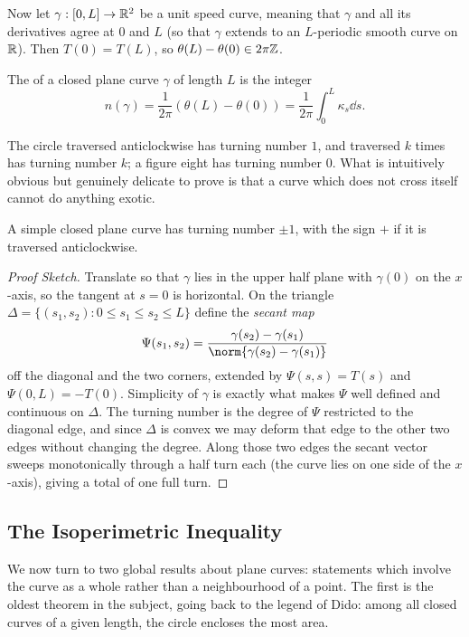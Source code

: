 \documentclass[a4paper]{scrartcl}
\begin{document}
Now let $\gamma: [0, L] \rightarrow \mathbb{R}^2$ be a  unit speed curve, meaning that $\gamma$ and all its derivatives agree at $0$ and $L$ (so that $\gamma$ extends to an $L$-periodic smooth curve on $\mathbb{R}$). Then $T(0) = T(L)$, so $\theta(L) - \theta(0) \in 2\pi\mathbb{Z}$.

\begin{definition}
    The  of a closed plane curve $\gamma$ of length $L$ is the integer
    $$
    n(\gamma) = \frac{1}{2\pi}\left(\theta(L) - \theta(0)\right) = \frac{1}{2\pi}\int_0^L \kappa_s \dd s.
    $$
\end{definition}

The circle traversed anticlockwise has turning number $1$, and traversed $k$ times has turning number $k$; a figure eight has turning number $0$. What is intuitively obvious but genuinely delicate to prove is that a curve which does not cross itself cannot do anything exotic.

\begin{theorem}
    A simple closed plane curve has turning number $\pm 1$, with the sign $+$ if it is traversed anticlockwise.
\end{theorem}
\begin{proof}[Proof Sketch]
    Translate so that $\gamma$ lies in the upper half plane with $\gamma(0)$ on the $x$-axis, so the tangent at $s = 0$ is horizontal. On the triangle $\Delta = \{(s_1, s_2) : 0 \leq s_1\leq s_2 \leq L\}$ define the \emph{secant map}
    $$
    \Psi(s_1,s_2) = \frac{\gamma(s_2)-\gamma(s_1)}{\norm{\gamma(s_2)-\gamma(s_1)}}
    $$
    off the diagonal and the two corners, extended by $\Psi(s,s) = T(s)$ and $\Psi(0,L) = -T(0)$. Simplicity of $\gamma$ is exactly what makes $\Psi$ well defined and continuous on $\Delta$. The turning number is the degree of $\Psi$ restricted to the diagonal edge, and since $\Delta$ is convex we may deform that edge to the other two edges without changing the degree. Along those two edges the secant vector sweeps monotonically through a half turn each (the curve lies on one side of the $x$-axis), giving a total of one full turn.
\end{proof}

\subsection{The Isoperimetric Inequality}

We now turn to two global results about plane curves: statements which involve the curve as a whole rather than a neighbourhood of a point. The first is the oldest theorem in the subject, going back to the legend of Dido: among all closed curves of a given length, the circle encloses the most area.
\end{document}
